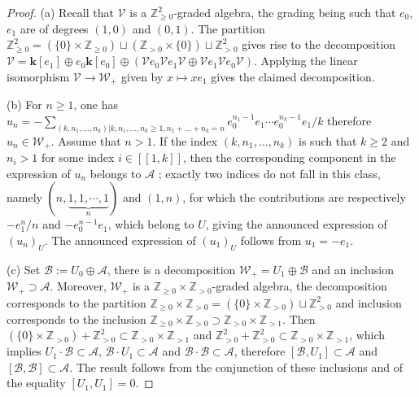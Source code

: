 \documentclass[10pt]{amsart}
\numberwithin{equation}{subsection}
\begin{document}
\begin{proof}
(a) Recall that $\mathcal V$ is a $\mathbb Z_{\geq 0}^2$-graded algebra, the grading being such that $e_0$, $e_1$ are of degrees $(1,0)$ and 
$(0,1)$. The partition $\mathbb Z_{\geq 0}^2=(\{0\}\times\mathbb Z_{\geq0})\sqcup(\mathbb Z_{>0}\times\{0\})\sqcup\mathbb Z_{>0}^2$ gives 
rise to the decomposition $\mathcal V=\mathbf k[e_1]\oplus e_0\mathbf k[e_0]\oplus(\mathcal Ve_0\mathcal Ve_1\mathcal V\oplus
\mathcal Ve_1\mathcal Ve_0\mathcal V)$. Applying the linear isomorphism $\mathcal V\to\mathcal W_+$ given by $x\mapsto xe_1$ gives the claimed 
decomposition. 

(b) For $n\geq1$, one has $u_n=-\sum_{(k,n_1,\ldots,n_k)|k,n_1,\ldots,n_k \geq 1, 
n_1+\ldots+n_k=n} e_0^{n_1-1}e_1\cdots e_0^{n_k-1}e_1/k$ therefore $u_n\in\mathcal W_+$. 
Assume that $n>1$. If the index $(k,n_1,\ldots,n_k)$ is such that $k\geq 2$ and $n_i>1$ for some index $i\in[\!\![1,k]\!\!]$, then 
the corresponding component in the expression of $u_n$ belongs to $\mathcal A$ ; exactly two indices do not fall in this class, 
namely $(n,{\underbrace{1,1,\cdots,1}_{n}})$ and $(1,n)$, for which the contributions are respectively $-e_1^n/n$ and $-e_0^{n-1}e_1$, 
which belong to $U$, giving the announced expression of $(u_n)_U$.  
The announced expression of $(u_1)_U$  follows from $u_1=-e_1$.

(c) Set $\mathcal B:=U_0\oplus\mathcal A$, there is a decomposition $\mathcal W_+=U_1\oplus\mathcal B$ and an inclusion
$\mathcal W_+\supset \mathcal A$. Moreover, $\mathcal W_+$ is a 
$\mathbb Z_{\geq 0}\times\mathbb Z_{>0}$-graded algebra, the decomposition corresponds to the partition $\mathbb Z_{\geq 0}\times
\mathbb Z_{>0}=(\{0\}\times\mathbb Z_{>0})\sqcup\mathbb Z_{>0}^2$ and inclusion corresponds to the inclusion 
$\mathbb Z_{\geq 0}\times\mathbb Z_{>0}\supset\mathbb Z_{>0}\times\mathbb Z_{>1}$. Then $(\{0\}\times\mathbb Z_{>0}) + \mathbb Z_{>0}^2 
\subset \mathbb Z_{>0}\times\mathbb Z_{>1}$ and $\mathbb Z_{>0}^2+\mathbb Z_{>0}^2 \subset \mathbb Z_{>0}\times\mathbb Z_{>1}$, which implies 
$U_1\cdot\mathcal B\subset\mathcal A$, $\mathcal B\cdot U_1\subset\mathcal A$ and $\mathcal B\cdot\mathcal B\subset\mathcal A$, therefore 
$[\mathcal B,U_1]\subset\mathcal A$ and $[\mathcal B,\mathcal B]\subset\mathcal A$. The result follows from the conjunction of these inclusions and 
of the equality $[U_1,U_1]=0$.   


\end{proof}
\end{document}
